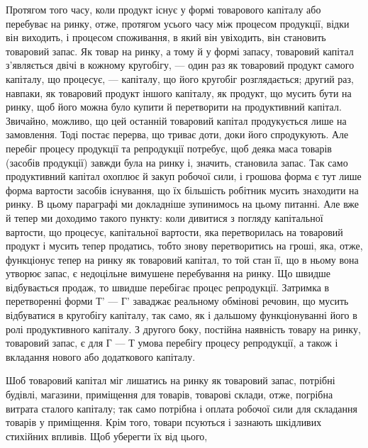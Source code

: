 Протягом того часу, коли продукт існує у формі товарового капіталу
або перебуває на ринку, отже, протягом усього часу між процесом
продукції, відки він виходить, і процесом споживання, в який він увіходить,
він становить товаровий запас. Як товар на ринку, а тому й у формі
запасу, товаровий капітал з’являється двічі в кожному кругобігу, — один
раз як товаровий продукт самого капіталу, що процесує, — капіталу, що
його кругобіг розглядається; другий раз, навпаки, як товаровий продукт
іншого капіталу, як продукт, що мусить бути на ринку, щоб його
можна було купити й перетворити на продуктивний капітал. Звичайно,
можливо, що цей останній товаровий капітал продукується лише на
замовлення. Тоді постає перерва, що триває доти, доки його спродукують.
Але перебіг процесу продукції та репродукції потребує, щоб деяка маса
товарів (засобів продукції) завжди була на ринку і, значить, становила запас.
Так само продуктивний капітал охоплює й закуп робочої сили, і грошова
форма є тут лише форма вартости засобів існування, що їх більшість робітник
мусить знаходити на ринку. В цьому параграфі ми докладніше зупинимось
на цьому питанні. Але вже й тепер ми доходимо такого пункту:
коли дивитися з погляду капітальної вартости, що процесує, капітальної
вартости, яка перетворилась на товаровий продукт і мусить тепер продатись,
тобто знову перетворитись на гроші, яка, отже, функціонує тепер на ринку
як товаровий капітал, то той стан її, що в ньому вона утворює запас, є
недоцільне вимушене перебування на ринку. Що швидше відбувається
продаж, то швидше перебігає процес репродукції. Затримка в
перетворенні форми Т' — Г' заваджає реальному обмінові речовин, що
мусить відбуватися в кругобігу капіталу, так само, як і дальшому функціонуванні
його в ролі продуктивного капіталу. З другого боку, постійна
наявність товару на ринку, товаровий запас, є для Г — Т умова перебігу
процесу репродукції, а також і вкладання нового або додаткового
капіталу.

Шоб товаровий капітал міг лишатись на ринку як товаровий запас,
потрібні будівлі, магазини, приміщення для товарів, товарові склади, отже,
погрібна витрата сталого капіталу; так само потрібна і оплата робочої
сили для складання товарів у приміщення. Крім того, товари псуються
і зазнають шкідливих стихійних впливів. Щоб уберегти їх від цього,
\parbreak{}  %
